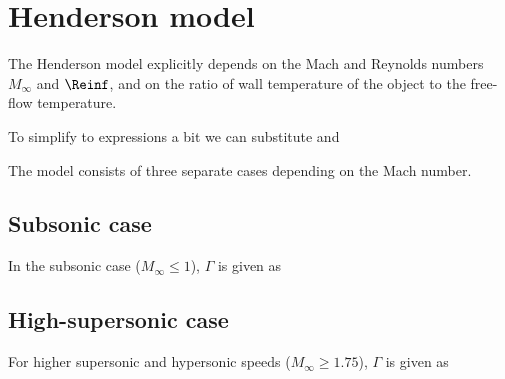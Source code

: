 \section{Henderson model} \label{DH}
    The Henderson model \cite{henderson} explicitly depends on the Mach
    and Reynolds numbers $M_\infty$ and $\Reinf$,
    and on the ratio of wall temperature of the object to the free-flow temperature.

    To simplify to expressions a bit we can substitute
    and

    The model consists of three separate cases depending on the Mach number.

    \subsection{Subsonic case}
        In the subsonic case ($M_\infty \leq 1$), $\Gamma$ is given as

    \subsection{High-supersonic case} \label{DH-h}
        For higher supersonic and hypersonic speeds ($M_\infty \geq \num{1.75}$), $\Gamma$ is given as

